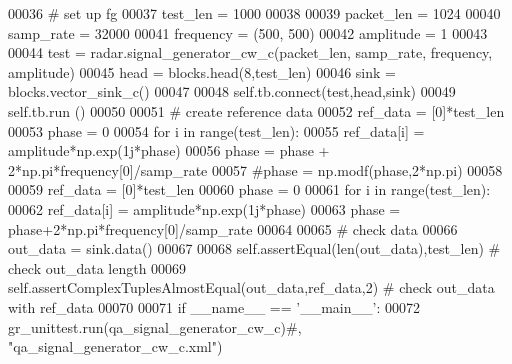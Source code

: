 \begin{DoxyCode}
00036         \textcolor{comment}{# set up fg}
00037         test\_len = 1000
00038         
00039         packet\_len = 1024
00040         samp\_rate = 32000
00041         frequency = (500, 500)
00042         amplitude = 1
00043         
00044         test = radar.signal\_generator\_cw\_c(packet\_len, samp\_rate, frequency, amplitude)
00045         head = blocks.head(8,test\_len)
00046         sink = blocks.vector\_sink\_c()
00047         
00048         self.tb.connect(test,head,sink)
00049         self.tb.run ()
00050         
00051         \textcolor{comment}{# create reference data}
00052         ref\_data = [0]*test\_len
00053         phase = 0
00054         \textcolor{keywordflow}{for} i \textcolor{keywordflow}{in} range(test\_len):
00055             ref\_data[i] = amplitude*np.exp(1j*phase)
00056             phase = phase + 2*np.pi*frequency[0]/samp\_rate
00057             \textcolor{comment}{#phase = np.modf(phase,2*np.pi)}
00058         
00059         ref\_data = [0]*test\_len
00060         phase = 0
00061         \textcolor{keywordflow}{for} i \textcolor{keywordflow}{in} range(test\_len):
00062             ref\_data[i] = amplitude*np.exp(1j*phase)
00063             phase = phase+2*np.pi*frequency[0]/samp\_rate
00064         
00065         \textcolor{comment}{# check data}
00066         out\_data = sink.data()
00067         
00068         self.assertEqual(len(out\_data),test\_len) \textcolor{comment}{# check out\_data length}
00069         self.assertComplexTuplesAlmostEqual(out\_data,ref\_data,2) \textcolor{comment}{# check out\_data with ref\_data}
00070 
00071 \textcolor{keywordflow}{if} \_\_name\_\_ == \textcolor{stringliteral}{'\_\_main\_\_'}:
00072     gr\_unittest.run(qa\_signal\_generator\_cw\_c)\textcolor{comment}{#, "qa\_signal\_generator\_cw\_c.xml")}
\end{DoxyCode}
